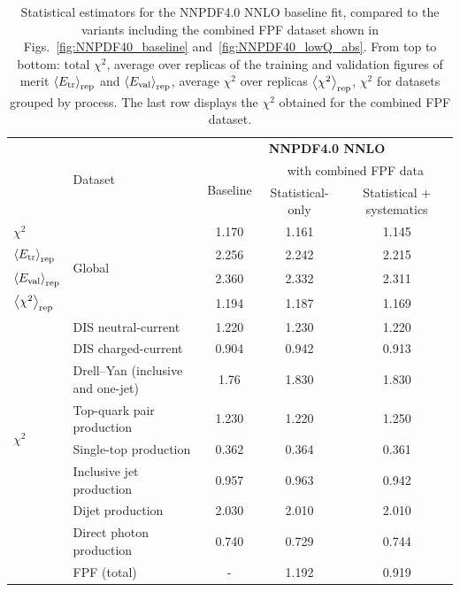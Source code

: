 \begin{table}[!t]
  \centering
  \footnotesize
  \renewcommand{\arraystretch}{1.30}
  \begin{tabularx}{\textwidth}{X|l|c|c|c}
  \toprule
  & \multirow{3}{*}{Dataset}
  & \multicolumn{3}{c}{\bf NNPDF4.0 NNLO} \\
  &
  & \multirow{2}{*}{Baseline}
  & \multicolumn{2}{c}{with combined FPF data}  \\
  &
  &
  & Statistical-only  & Statistical + systematics  \\
  \midrule
  $\chi^2$ &  \multirow{4}{*}{Global}  & 1.170 &  1.161  & 1.145  \\
  $\left\langle E_{\rm tr}\right\rangle_{\rm rep}$
  &  &  2.256  &  2.242   & 2.215   \\
  $\left\langle E_{\rm val}\right\rangle_{\rm rep}$
  & & 2.360    &   2.332  & 2.311  \\
  $\left\langle \chi^2\right\rangle_{\rm rep}$
  & &   1.194   &    1.187    & 1.169  \\
  \midrule
  \multirow{8}{*}{$\chi^2$}
  & DIS neutral-current                     &  1.220    &  1.230    &   1.220   \\
  & DIS charged-current                     &   0.904  &   0.942    &  0.913    \\
  & Drell--Yan (inclusive and one-jet) &  1.76   &   1.830    &   1.830   \\
  & Top-quark pair production               &  1.230   &   1.220    &  1.250    \\
  & Single-top production                   &  0.362   &   0.364    &   0.361   \\
  & Inclusive jet production                &  0.957   &  0.963     &   0.942   \\
  & Dijet production                        &  2.030    &    2.010   &   2.010   \\
  & Direct photon production                 &  0.740  &   0.729    &    0.744  \\
  & FPF (total)                 &  -  &   1.192    &   0.919   \\
  \bottomrule
\end{tabularx}
\vspace{0.2cm}
\caption{\small Statistical estimators for the NNPDF4.0 NNLO
  baseline fit, compared to the variants including
  the combined FPF dataset shown in Figs.~\ref{fig:NNPDF40_baseline}
  and~\ref{fig:NNPDF40_lowQ_abs}.
  From top to bottom: total $\chi^2$, average
  over replicas of the training and validation figures of merit
  $\left\langle E_{\rm tr}\right\rangle_{\rm rep}$ and $\left\langle E_{\rm val}\right\rangle_{\rm rep}$,
  average $\chi^2$ over replicas $\left\langle \chi^2\right\rangle_{\rm rep}$,
  $\chi^2$ for datasets grouped by process.
  The last row displays the $\chi^2$ obtained for the combined FPF dataset.
  \label{tab:chi2_nnpdf40_baseline}
}
\end{table}


